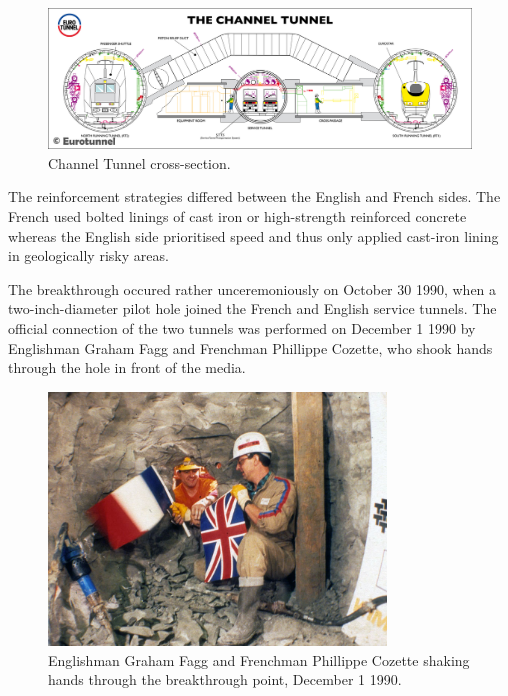 \documentclass[12pt]{article} %
\begin{document}
\begin{figure}[tp]
  \centering
  \includegraphics[width=\textwidth]{tunnelcross}
  \caption{Channel Tunnel cross-section.}
  \label{fig:cross}
\end{figure}

The reinforcement strategies differed between the English and French sides. The French used bolted linings of cast iron or high-strength reinforced concrete whereas the English side prioritised speed and thus only applied cast-iron lining in geologically risky areas.

The breakthrough occured rather unceremoniously on October 30 1990, when a two-inch-diameter pilot hole joined the French and English service tunnels. The official connection of the two tunnels was performed on December 1 1990 by Englishman Graham Fagg and Frenchman Phillippe Cozette, who shook hands through the hole in front of the media.

\begin{figure}[tp]
  \centering
  \includegraphics[width=0.8\textwidth]{breakthrough}
  \caption{Englishman Graham Fagg and Frenchman Phillippe Cozette shaking hands through the breakthrough point, December 1 1990.}
  \label{fig:break}
\end{figure}
\end{document}
